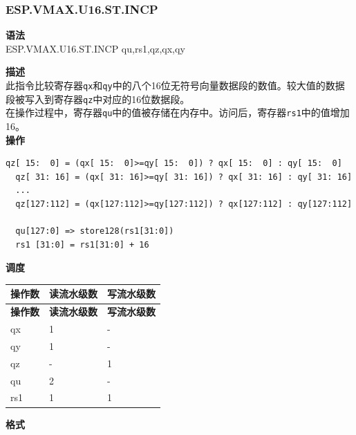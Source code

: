 \newpage

\newpage
\subsubsection{ESP.VMAX.U16.ST.INCP}\label{instruction:ESPVMAXU16STINCP}
\textbf{语法}\\
ESP.VMAX.U16.ST.INCP qu,rs1,qz,qx,qy

\textbf{描述}\\
此指令比较寄存器\lstinline{qx}和\lstinline{qy}中的八个16位无符号向量数据段的数值。较大值的数据段被写入到寄存器\lstinline{qz}中对应的16位数据段。\\在操作过程中，寄存器\lstinline{qu}中的值被存储在内存中。访问后，寄存器\lstinline{rs1}中的值增加16。\\
\textbf{操作}
\begin{lstlisting}[escapeinside=`?]
  qz[ 15:  0] = (qx[ 15:  0]>=qy[ 15:  0]) ? qx[ 15:  0] : qy[ 15:  0]
  qz[ 31: 16] = (qx[ 31: 16]>=qy[ 31: 16]) ? qx[ 31: 16] : qy[ 31: 16]
  ...
  qz[127:112] = (qx[127:112]>=qy[127:112]) ? qx[127:112] : qy[127:112]

  qu[127:0] => store128(rs1[31:0])
  rs1 [31:0] = rs1[31:0] + 16
\end{lstlisting}


\textbf{调度}\\
\begin{longtable}[c]{|l|l|l|}
    \hline
    \rowcolor{lightgray}
    \textbf{操作数} & \textbf{读流水级数} & \textbf{写流水级数} \\\hline
    \endfirsthead
    \hline
    \rowcolor{lightgray}
     \textbf{操作数} & \textbf{读流水级数} & \textbf{写流水级数} \\\hline
    \endhead
    \hline
    \endfoot

    qx & 1 & - \\\hline
  qy & 1 & - \\\hline
     qz & - & 1 \\\hline
     qu & 2 & - \\\hline
     rs1 & 1 & 1

\end{longtable}

\textbf{格式}\\

